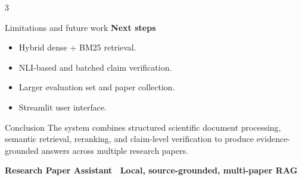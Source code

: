 \documentclass[a0,portrait]{a0poster}
\begin{document}
\begin{multicols}{3}
\begin{posterbox}{Limitations and future work}
\textbf{Next steps}
\begin{itemize}
  \item Hybrid dense + BM25 retrieval.
  \item NLI-based and batched claim verification.
  \item Larger evaluation set and paper collection.
  \item Streamlit user interface.
\end{itemize}
\end{posterbox}

\begin{posterbox}[colback=PosterNavy,colframe=PosterNavy,coltext=white]{Conclusion}
The system combines structured scientific document processing, semantic
retrieval, reranking, and claim-level verification to produce evidence-grounded
answers across multiple research papers.
\end{posterbox}

\end{multicols}

\vfill
\begin{center}
{\large\color{PosterNavy}\bfseries Research Paper Assistant \textbullet\ Local, source-grounded, multi-paper RAG}
\end{center}
\end{document}
